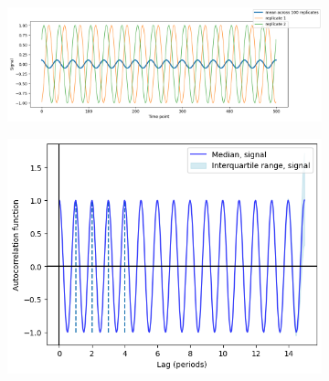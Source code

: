 \begin{figure}
  \centering
  \begin{subfigure}[t]{0.6\textwidth}
  \centering
    \includegraphics[width=\linewidth]{sinusoids_outofphase}
    \caption{
    }
    \label{fig:acf-sinusoids-nonoise-ts}
  \end{subfigure}%
  \centering
  \begin{subfigure}[t]{0.4\textwidth}
  \centering
    \includegraphics[width=\linewidth]{sinusoids_outofphase_acf_corrected}
    \caption{
    }
    \label{fig:acf-sinusoids-nonoise-acf}
  \end{subfigure}


\end{figure}
